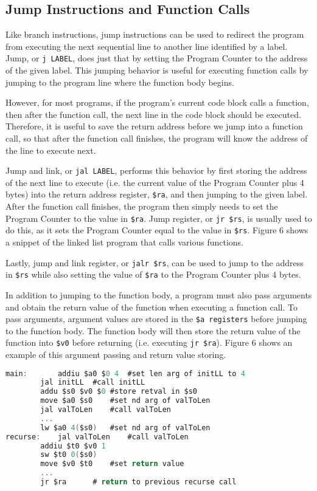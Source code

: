 \documentclass{article}
\begin{document}
\subsection{Jump Instructions and Function Calls}
Like branch instructions, jump instructions can be used to redirect the program from executing the next sequential line to another line identified by a label. Jump, or \texttt{j LABEL}, does just that by setting the Program Counter to the address of the given label. This jumping behavior is useful for executing function calls by jumping to the program line where the function body begins.

However, for most programs, if the program's current code block calls a function, then after the function call, the next line in the code block should be executed. Therefore, it is useful to save the return address before we jump into a function call, so that after the function call finishes, the program will know the address of the line to execute next. 

Jump and link, or \texttt{jal LABEL}, performs this behavior by first storing the address of the next line to execute (i.e. the current value of the Program Counter plus 4 bytes) into the return address register, \texttt{\$ra}, and then jumping to the given label. After the function call finishes, the program then simply needs to set the Program Counter to the value in \texttt{\$ra}. Jump register, or \texttt{jr \$rs}, is usually used to do this, as it sets the Program Counter equal to the value in \texttt{\$rs}.  Figure 6 shows a snippet of the linked list program that calls various functions.

Lastly, jump and link register, or \texttt{jalr \$rs}, can be used to jump to the address in \texttt{\$rs} while also setting the value of \texttt{\$ra} to the Program Counter plus 4 bytes.

In addition to jumping to the function body, a program must also pass arguments and obtain the return value of the function when executing a function call. To pass arguments, argument values are stored in the \texttt{\$a registers} before jumping to the function body. The function body will then store the return value of the function into \texttt{\$v0} before returning (i.e. executing \texttt{jr \$ra}). Figure 6 shows an example of this argument passing and return value storing.
\begin{center}
\renewcommand{\ttdefault}{pcr}
\begin{lstlisting}[language=C, basicstyle=\ttfamily, keywordstyle=\bfseries, showstringspaces=false, morekeywords={jal, addu, move, bne, j, sw, addiu, lw, jr}]
main:		addiu $a0 $0 4	#set len arg of initLL to 4
		jal initLL	#call initLL
		addu $s0 $v0 $0	#store retval in $s0
		move $a0 $s0	#set nd arg of valToLen
		jal valToLen	#call valToLen
		...
		lw $a0 4($s0)	#set nd arg of valToLen
recurse:	jal valToLen	#call valToLen
		addiu $t0 $v0 1
		sw $t0 0($s0)
		move $v0 $t0	#set return value
		...
		jr $ra		# return to previous recurse call
\end{lstlisting}
\end{center}
\end{document}
